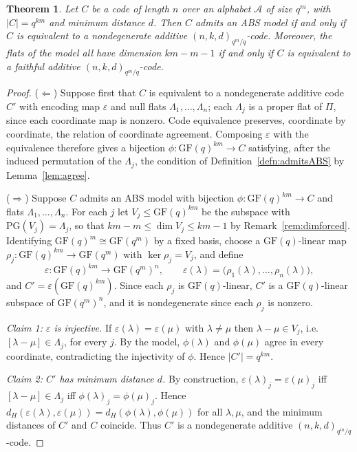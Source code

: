 \documentclass[12pt]{article}
\newtheorem{thm}{Theorem}[section]
\theoremstyle{definition}
\numberwithin{equation}{section}
\newcommand{\A}{\mathcal{A}}
\newcommand{\la}{\lambda}
\newcommand{\GF}[1]{\mathrm{GF}(#1)}
\newcommand{\PGv}[1]{\mathrm{PG}(#1)}
\begin{document}
\begin{thm}\label{thm:ABS}
Let $C$ be a code of length $n$ over an alphabet $\A$ of size $q^m$, with $|C|=q^{km}$ and minimum distance $d$.  Then $C$ admits an ABS model if and only if $C$ is equivalent to a nondegenerate additive $(n,k,d)_{q^m/q}$-code.  Moreover, the flats of the model all have dimension $km-m-1$ if and only if $C$ is equivalent to a faithful additive $(n,k,d)_{q^m/q}$-code.
\end{thm}

\begin{proof}
($\Leftarrow$)  Suppose first that $C$ is equivalent to a nondegenerate additive code $C'$ with encoding map $\varepsilon$ and null flats $\Lambda_1,\ldots,\Lambda_n$; each $\Lambda_j$ is a proper flat of $\Pi$, since each coordinate map is nonzero.  Code equivalence preserves, coordinate by coordinate, the relation of coordinate agreement. Composing $\varepsilon$ with the equivalence therefore gives a bijection $\phi:\GF{q}^{km}\to C$ satisfying, after the induced permutation of the $\Lambda_j$, the condition of Definition~\ref{defn:admitsABS} by Lemma~\ref{lem:agree}.

($\Rightarrow$)  Suppose $C$ admits an ABS model with bijection $\phi:\GF{q}^{km}\to C$ and flats $\Lambda_1,\ldots,\Lambda_n$.  For each $j$ let $V_j\le\GF{q}^{km}$ be the subspace with $\PGv{V_j}=\Lambda_j$, so that $km-m\le\dim V_j\le km-1$ by Remark~\ref{rem:dimforced}.  Identifying $\GF{q}^m\cong\GF{q^m}$ by a fixed basis, choose a $\GF{q}$-linear map $\rho_j:\GF{q}^{km}\to\GF{q^m}$ with $\ker\rho_j=V_j$, and define
\[
  \varepsilon:\GF{q}^{km}\to\GF{q^m}^n,\qquad \varepsilon(\la)=\bigl(\rho_1(\la),\ldots,\rho_n(\la)\bigr),
\]
and $C'=\varepsilon(\GF{q}^{km})$.  Since each $\rho_j$ is $\GF{q}$-linear, $C'$ is a $\GF{q}$-linear subspace of $\GF{q^m}^n$, and it is nondegenerate since each $\rho_j$ is nonzero.

\smallskip
\noindent\textit{Claim 1: $\varepsilon$ is injective.}
If $\varepsilon(\la)=\varepsilon(\mu)$ with $\la\neq\mu$ then $\la-\mu\in V_j$, i.e.\ $[\la-\mu]\in \Lambda_j$, for every $j$. By the model, $\phi(\la)$ and $\phi(\mu)$ agree in every coordinate, contradicting the injectivity of $\phi$.  Hence $|C'|=q^{km}$.

\smallskip
\noindent\textit{Claim 2: $C'$ has minimum distance $d$.}
By construction, $\varepsilon(\la)_j=\varepsilon(\mu)_j$ iff $[\la-\mu]\in \Lambda_j$ iff $\phi(\la)_j=\phi(\mu)_j$.  Hence $d_H(\varepsilon(\la),\varepsilon(\mu))=d_H(\phi(\la),\phi(\mu))$ for all $\la,\mu$, and the minimum distances of $C'$ and $C$ coincide.  Thus $C'$ is a nondegenerate additive $(n,k,d)_{q^m/q}$-code.


\end{proof}
\end{document}
